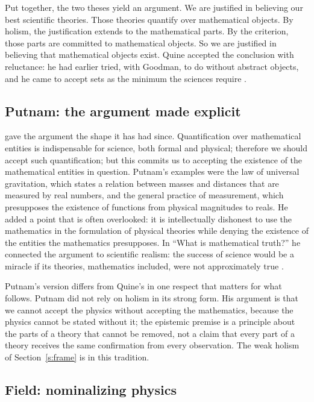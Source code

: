 \documentclass{situationist-preprint}
\begin{document}
Put together, the two theses yield an argument. We are justified in believing our best scientific theories. Those theories quantify over mathematical objects. By holism, the justification extends to the mathematical parts. By the criterion, those parts are committed to mathematical objects. So we are justified in believing that mathematical objects exist. Quine accepted the conclusion with reluctance: he had earlier tried, with Goodman, to do without abstract objects, and he came to accept sets as the minimum the sciences require \citep{Quine1960}.

\subsection{Putnam: the argument made explicit}

\citet{Putnam1971} gave the argument the shape it has had since. Quantification over mathematical entities is indispensable for science, both formal and physical; therefore we should accept such quantification; but this commits us to accepting the existence of the mathematical entities in question. Putnam's examples were the law of universal gravitation, which states a relation between masses and distances that are measured by real numbers, and the general practice of measurement, which presupposes the existence of functions from physical magnitudes to reals. He added a point that is often overlooked: it is intellectually dishonest to use the mathematics in the formulation of physical theories while denying the existence of the entities the mathematics presupposes. In \enquote{What is mathematical truth?} he connected the argument to scientific realism: the success of science would be a miracle if its theories, mathematics included, were not approximately true \citep{Putnam1975}.

Putnam's version differs from Quine's in one respect that matters for what follows. Putnam did not rely on holism in its strong form. His argument is that we cannot accept the physics without accepting the mathematics, because the physics cannot be stated without it; the epistemic premise is a principle about the parts of a theory that cannot be removed, not a claim that every part of a theory receives the same confirmation from every observation. The weak holism of Section~\ref{s:frame} is in this tradition.

\subsection{Field: nominalizing physics}
\end{document}
